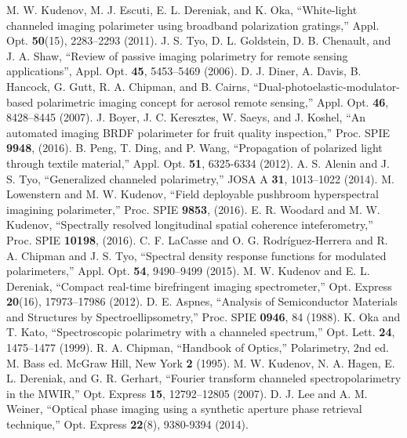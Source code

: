 \documentclass[10pt]{article}
\numberwithin{equation}{subsection}
\begin{document}
\begin{thebibliography}{9}
     M. W. Kudenov, M. J. Escuti, E. L. Dereniak, and K. Oka, ``White-light channeled imaging polarimeter using broadband polarization gratings,'' Appl. Opt. \textbf{50}(15),
2283--2293 (2011).
     J. S. Tyo, D. L. Goldstein, D. B. Chenault, and J. A. Shaw, ``Review of passive imaging polarimetry for remote sensing applications'', Appl. Opt. \textbf{45}, 5453--5469 (2006).
     D. J. Diner, A. Davis, B. Hancock, G. Gutt, R. A. Chipman, and B. Cairns, ``Dual-photoelastic-modulator-based polarimetric imaging concept for aerosol remote sensing,'' Appl. Opt. \textbf{46}, 8428--8445 (2007).
     J. Boyer, J. C. Keresztes, W. Saeys, and J. Koshel, ``An automated imaging BRDF polarimeter for fruit quality inspection,'' Proc. SPIE \textbf{9948}, (2016).
     B. Peng, T. Ding, and P. Wang, ``Propagation of polarized light through textile material,'' Appl. Opt. \textbf{51}, 6325-6334 (2012).
     A. S. Alenin and J. S. Tyo, ``Generalized channeled polarimetry,'' JOSA A \textbf{31}, 1013--1022 (2014).
     M. Lowenstern and M. W. Kudenov, ``Field deployable pushbroom hyperspectral imagining polarimeter,'' Proc. SPIE \textbf{9853}, (2016).
     E. R. Woodard and M. W. Kudenov, ``Spectrally resolved longitudinal spatial coherence inteferometry,'' Proc. SPIE \textbf{10198}, (2016).
     C. F. LaCasse and O. G. Rodr\'{i}guez-Herrera and R. A. Chipman and J. S. Tyo, ``Spectral density response functions for modulated polarimeters,'' Appl. Opt. \textbf{54}, 9490--9499 (2015).
     M. W. Kudenov and E. L. Dereniak, ``Compact real-time birefringent
imaging spectrometer,'' Opt. Express \textbf{20}(16), 17973--17986 (2012).
     D. E. Aspnes, ``Analysis of Semiconductor Materials and Structures by
    Spectroellipsometry,'' Proc. SPIE \textbf{0946}, 84 (1988).
     K. Oka and T. Kato, ``Spectroscopic polarimetry with a channeled spectrum,'' Opt.
Lett. \textbf{24}, 1475--1477 (1999).
     R. A. Chipman, ``Handbook of Optics,'' Polarimetry, 2nd ed. M. Bass ed. McGraw Hill, New York \textbf{2} (1995).
     M. W. Kudenov, N. A. Hagen, E. L. Dereniak, and G. R. Gerhart, ``Fourier transform channeled spectropolarimetry in the MWIR,'' Opt. Express \textbf{15}, 12792--12805 (2007).
        D. J. Lee and A. M. Weiner, ``Optical phase imaging using a synthetic aperture phase retrieval technique,'' Opt. Express \textbf{22}(8), 9380-9394 (2014).

\end{thebibliography}
\end{document}
